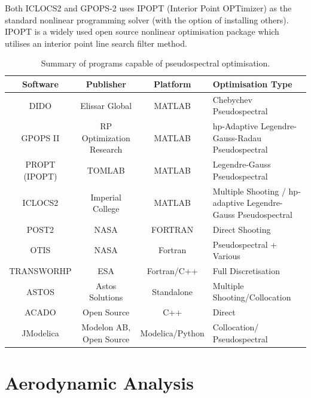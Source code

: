  Both ICLOCS2 and GPOPS-2 uses IPOPT\cite{Wachter2006} (Interior Point OPTimizer) as the standard nonlinear programming solver (with the option of installing others). IPOPT is a widely used open source nonlinear optimisation package which utilises an interior point line search filter method. 

\begin{table}[ht]
	
	\begin{tabular}{|c|c|c| p{4cm}|}
		\hline \textbf{Software} & \textbf{Publisher} & \textbf{Platform} & \textbf{Optimisation Type} \\ 
		\hline DIDO\cite{Ross2002} & Elissar Global & MATLAB & Chebychev Pseudospectral \\ 
		\hline GPOPS II\cite{Rao2010} & RP Optimization Research & MATLAB & \textsf{hp}-Adaptive Legendre-Gauss-Radau Pseudospectral \\ 
		\hline PROPT (IPOPT)\cite{Rutquist2010}& TOMLAB & MATLAB & Legendre-Gauss  Pseudospectral  \\ 
		\hline ICLOCS2\cite{iclocs} & Imperial College & MATLAB &  Multiple Shooting / \textsf{hp}-adaptive Legendre-Gauss Pseudospectral  \\ 
		\hline POST2\cite{WilliamColson} & NASA & FORTRAN & Direct Shooting \\ 
		\hline OTIS\cite{otis} & NASA  & Fortran & Pseudospectral + Various  \\ 
		\hline TRANSWORHP\cite{Wassel2013} & ESA & Fortran/C++ & Full Discretisation \\ 
		\hline ASTOS\cite{astos} & Astos Solutions & Standalone & Multiple Shooting/Collocation  \\  
		\hline ACADO\cite{Houska2011} & Open Source & C++ &  Direct \\  
		\hline JModelica\cite{jmodelica} & Modelon AB, Open Source & Modelica/Python &  Collocation/ Pseudospectral \\  
		
		\hline 
	\end{tabular} 
	
	\caption{Summary of programs capable of pseudospectral optimisation.}
	\label{table:programs}
\end{table}









\section{Aerodynamic Analysis}


